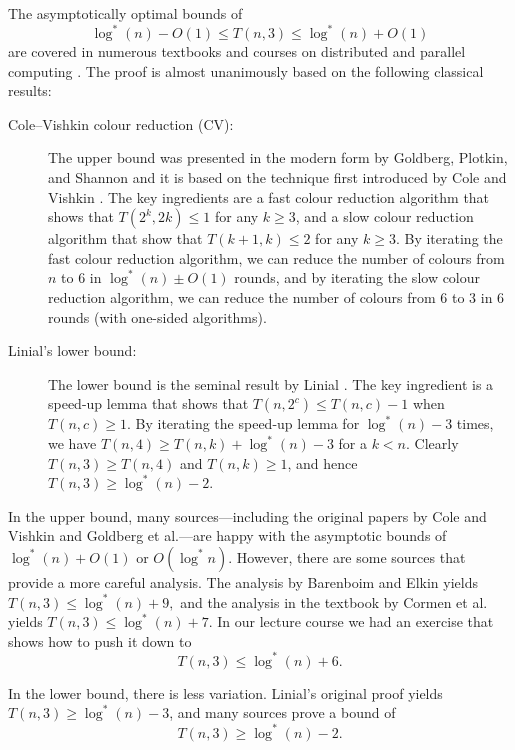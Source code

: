 \documentclass[a4paper,11pt]{article}
\theoremstyle{remark}
\newcommand{\logst}{\log^{*}}
\begin{document}
The asymptotically optimal bounds of
\[
    \logst(n) - O(1) \le T(n,3) \le \logst(n) + O(1)
\]
are covered in numerous textbooks and courses on distributed and parallel computing \cite{cormen90introduction,peleg00distributed,barenboim13distributed,wattenhofer13lecture,suomela-dabook}. The proof is almost unanimously based on the following classical results:
\begin{description}
    \item[Cole--Vishkin colour reduction (CV):] The upper bound was presented in the modern form by Goldberg, Plotkin, and Shannon \cite{goldberg88parallel} and it is based on the technique first introduced by Cole and Vishkin \cite{cole86deterministic}. The key ingredients are a fast colour reduction algorithm that shows that $T(2^k,2k) \le 1$ for any $k \ge 3$, and a slow colour reduction algorithm that show that $T(k+1,k) \le 2$ for any $k \ge 3$. By iterating the fast colour reduction algorithm, we can reduce the number of colours from $n$ to $6$ in $\logst(n) \pm O(1)$ rounds, and by iterating the slow colour reduction algorithm, we can reduce the number of colours from $6$ to $3$ in $6$ rounds (with one-sided algorithms).
    \item[Linial's lower bound:] The lower bound is the seminal result by Linial \cite{linial92locality}. The key ingredient is a speed-up lemma that shows that $T(n,2^c) \le T(n,c) - 1$ when $T(n,c) \ge 1$. By iterating the speed-up lemma for $\logst(n)-3$ times, we have $T(n,4) \ge T(n,k) + \logst(n) - 3$ for a $k < n$. Clearly $T(n,3) \ge T(n,4)$ and $T(n,k) \ge 1$, and hence $T(n,3) \ge \logst(n) - 2$.
\end{description}

In the upper bound, many sources---including the original papers by Cole and Vishkin and Goldberg et al.---are happy with the asymptotic bounds of $\logst(n) + O(1)$ or $O(\logst n)$. However, there are some sources that provide a more careful analysis. The analysis by Barenboim and Elkin \cite{barenboim13distributed} yields
$
    T(n,3) \le \logst(n) + 9,
$
and the analysis in the textbook by Cormen et al.~\cite{cormen90introduction} yields
$
    T(n,3) \le \logst(n) + 7
$.
In our lecture course \cite{suomela-dabook} we had an exercise that shows how to push it down to
\[
    T(n,3) \le \logst(n) + 6.
\]

In the lower bound, there is less variation. Linial's original proof \cite{linial92locality} yields $T(n,3) \ge \logst(n) - 3$, and many sources \cite{barenboim13distributed,suomela-dabook,laurinharju14linial-easy} prove a bound of
\[
    T(n,3) \ge \logst(n) - 2.
\]
\end{document}
